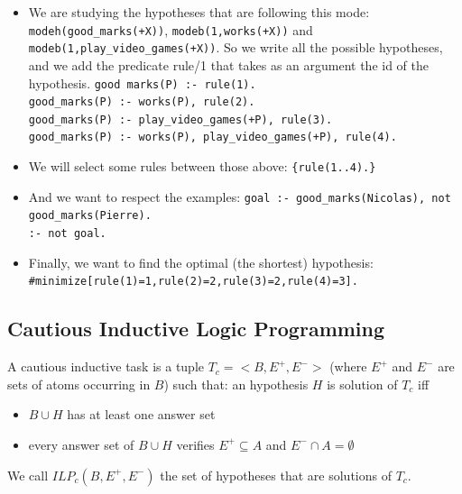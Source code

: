 \begin{itemize}
\item We are studying the hypotheses that are following this mode: \texttt{modeh(good\_marks(+X))}, \texttt{modeb(1,works(+X))} and \texttt{modeb(1,play\_video\_games(+X))}. So we write all the possible hypotheses, and we add the predicate rule/1 that takes as an argument the id of the hypothesis.\newline
\texttt{good marks(P) :- rule(1).\\
good\_marks(P) :- works(P), rule(2).\\
good\_marks(P) :- play\_video\_games(+P), rule(3).\\
good\_marks(P) :- works(P), play\_video\_games(+P), rule(4).}

\item We will select some rules between those above:\newline
\texttt{\{rule(1..4).\}}

\item And we want to respect the examples:\newline
\texttt{goal :- good\_marks(Nicolas), not good\_marks(Pierre).\\
:- not goal.}

\item Finally, we want to find the optimal (the shortest) hypothesis:\newline
\texttt{\#minimize[rule(1)=1,rule(2)=2,rule(3)=2,rule(4)=3].}

\end{itemize}





\subsection{Cautious Inductive Logic Programming}

A cautious inductive task is a tuple $T_c=<B, E^+, E^->$ (where $E^+$ and $E^-$ are sets of atoms occurring in $B$) such that: an hypothesis $H$ is solution of $T_c$ iff 
\begin{itemize}
\item $B\cup H$ has at least one answer set
\item every answer set of $B\cup H$ verifies $E^+\subseteq A$ and $E^-\cap A = \emptyset$
\end{itemize}

We call $ILP_c(B,E^+,E^-)$ the set of hypotheses that are solutions of $T_c$. 

